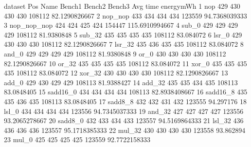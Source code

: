 \begin{filecontents}{dataset}
Pos	Name	Bench1	Bench2	Bench3	Avg	time	energymWh
1	nop	429	430	430	430	108112	82.1290826667
2	nop\_nop	433	434	434	434	123559	94.7368039333
3	nop\_nop\_nop	424	424	425	424	154447	115.6910994667
4	sub\_0	429	429	429	429	108112	81.9380848
5	sub\_32	435	435	435	435	108112	83.084072
6	lsr\_0	429	430	430	430	108112	82.1290826667
7	lsr\_32	435	436	435	435	108112	83.084072
8	and\_0	429	429	429	429	108112	81.9380848
9	or\_0	430	430	430	430	108112	82.1290826667
10	or\_32	435	435	435	435	108112	83.084072
11	xor\_0	435	435	435	435	108112	83.084072
12	xor\_32	430	430	430	430	108112	82.1290826667
13	add\_0	429	430	429	429	108113	81.9388427
14	add\_32	435	435	434	435	108113	83.0848405
15	sadd16\_0	434	434	434	434	108113	82.8938408667
16	sadd16\_8	435	435	436	435	108113	83.0848405
17	sadd8\_8	432	432	431	432	123555	94.297176
18	lsl\_0	434	434	434	434	123556	94.7345037333
19	and\_32	427	427	427	427	123556	93.2065278667
20	sadd8\_0	432	433	434	433	123557	94.5169864333
21	lsl\_32	436	436	436	436	123557	95.1718385333
22	mul\_32	430	430	430	430	123558	93.862894
23	mul\_0	425	425	425	425	123559	92.7722158333
\end{filecontents}


